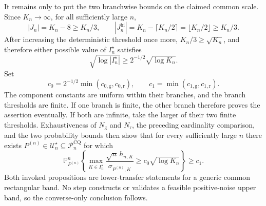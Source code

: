 It remains only to put the two branchwise bounds on the claimed common scale.  Since \(K_n\to\infty\), for all sufficiently large \(n\),
\[
 |J_n|=K_n-8\geq K_n/3,
 \qquad
 |J_n^{\mathrm{hi}}|=K_n-\lceil K_n/2\rceil
 =\lfloor K_n/2\rfloor\geq K_n/3.
\]
After increasing the deterministic threshold once more, \(K_n/3\geq\sqrt{K_n}\), and therefore either possible value of \(I_n^\star\) satisfies
\[
 \sqrt{\log|I_n^\star|}
 \geq2^{-1/2}\sqrt{\log K_n}.
\]
Set
\[
 c_0=2^{-1/2}\min(c_{0,\mathrm g},c_{0,\mathrm r}),
 \qquad
 c_1=\min(c_{1,\mathrm g},c_{1,\mathrm r}).
\]
The component constants are uniform within their branches, and the branch thresholds are finite.  If one branch is finite, the other branch therefore proves the assertion eventually.  If both are infinite, take the larger of their two finite thresholds.  Exhaustiveness of \(N_{\mathrm g}\) and \(N_{\mathrm r}\), the preceding cardinality comparison, and the two probability bounds then show that for every sufficiently large \(n\) there exists \(P^{(n)}\in\mathcal U_n^\star\subseteq\mathcal P_n^{\mathrm{CQ}}\) for which
\[
 \mathbb P_{P^{(n)}}^n\!\left\{
 \max_{K\in I_n^\star}
 \frac{\sqrt n\,h_{n,K}}{\sigma_{P^{(n)},K}}
 \geq c_0\sqrt{\log K_n}
 \right\}\geq c_1.
\]
Both invoked propositions are lower-transfer statements for a generic common rectangular band.  No step constructs or validates a feasible positive-noise upper band, so the converse-only conclusion follows.